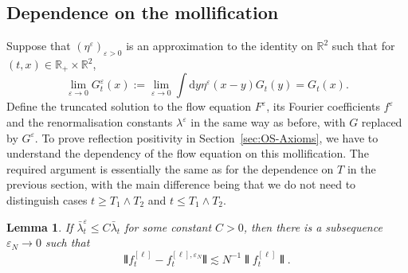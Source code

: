 \documentclass[11pt, a4paper]{scrartcl}
\numberwithin{equation}{section}
\theoremstyle{plain}
\newtheorem{lemma}[foo]{Lemma}
\theoremstyle{remark}
\newcommand{\assign}{:=}
\newcommand{\mathd}{\mathrm{d}}
\begin{document}
\subsection{Dependence on the mollification}

Suppose that $(\eta^{\varepsilon})_{\varepsilon > 0}$ is an approximation to
the identity on $\mathbb{R}^2$ such that for $(t, x) \in \mathbb{R}_+ \times
	\mathbb{R}^2$,
\[ \lim_{\varepsilon \rightarrow 0} G^{\varepsilon}_t (x) \assign
	\lim_{\varepsilon \rightarrow 0}  \int \mathd y \eta^{\varepsilon} (x - y)
	G_t (y) = G_t (x) . \]
Define the truncated solution to the flow equation $F^{\varepsilon}$, its
Fourier coefficients $f^{\varepsilon}$ and the renormalisation constants
$\lambda^{\varepsilon}$ in the same way as before, with $G$ replaced by
$G^{\varepsilon}$. To prove reflection positivity in
Section~\ref{sec:OS-Axioms}, we have to understand the dependency of the flow
equation on this mollification.
The required argument is essentially the same as for the dependence on $T$ in
the previous section, with the main difference being that we do not need to
distinguish cases $t\geq T_1\wedge T_2$ and $t\leqslant T_1\wedge T_2$.

\begin{lemma}
	\label{lem:f-eps-convergence}If $\bar{\lambda}_t^{\varepsilon} \leqslant C
		\bar{\lambda}_t$ for some constant $C > 0$, then there is a subsequence
	$\varepsilon_N \rightarrow 0$ such that
	\[ \interleave f^{[\ell]}_t - f_t^{[\ell], \varepsilon_N} \interleave
		\lesssim N^{- 1} \interleave f_t^{[\ell]} \interleave . \]
\end{lemma}
\end{document}
